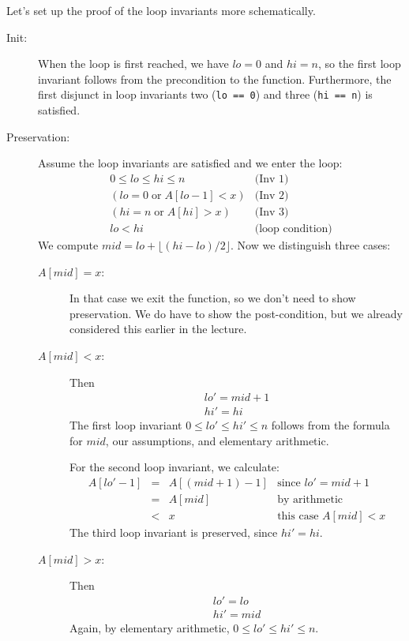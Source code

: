 \clearpage
Let's set up the proof of the loop invariants more schematically.
\begin{description}
\item[Init: ]%
  When the loop is first reached, we have $\mathit{lo} = 0$ and $\mathit{hi} =
  n$, so the first loop invariant follows from the precondition to the
  function.  Furthermore, the first disjunct in loop invariants two
  (\lstinline'lo == 0') and three (\lstinline'hi == n') is satisfied.
\item[Preservation: ]%
  Assume the loop invariants are satisfied and we enter the loop:
  $$
  \begin{array}{ll}
     0 \leq \mathit{lo} \leq \mathit{hi} \leq n           & \text{(Inv 1)}
  \\ (\mathit{lo} = 0\; \text{or}\; A[\mathit{lo}-1] < x) & \text{(Inv 2)}
  \\ (\mathit{hi} = n\; \text{or}\; A[\mathit{hi}] > x)   & \text{(Inv 3)}
  \\ \mathit{lo} < \mathit{hi}                            & \text{(loop condition)}
  \end{array}
  $$
  We compute $\mathit{mid} = \mathit{lo} + \lfloor (\mathit{hi}-\mathit{lo})/2
  \rfloor$.  Now we distinguish three cases:
  \begin{description}
  \item[{$A[\mathit{mid}] = x$}: ]%
    In that case we exit the function, so we don't need to show preservation.
    We do have to show the post-condition, but we already considered this
    earlier in the lecture.
  \item[{$A[\mathit{mid}] < x$}: ]%
    Then
    $$
    \begin{array}{l}
       \mathit{lo}' = \mathit{mid}+1
    \\ \mathit{hi}' = \mathit{hi}
    \end{array}
    $$
    The first loop invariant $0 \leq \mathit{lo}' \leq \mathit{hi}' \leq n$
    follows from the formula for $\mathit{mid}$, our assumptions, and
    elementary arithmetic.

    For the second loop invariant, we calculate:
    $$
    \begin{array}{lcll}
       A[\mathit{lo}'-1] &=& A[(\mathit{mid}+1)-1]
     & \text{since } \mathit{lo}' = \mathit{mid}+1
    \\                   &=& A[\mathit{mid}]
     & \text{by arithmetic}
    \\                   &<& x
     & \text{this case } A[\mathit{mid}] < x
    \end{array}
    $$
    The third loop invariant is preserved, since $\mathit{hi}' =
    \mathit{hi}$.
  \item[{$A[\mathit{mid}] > x$}: ]%
    Then
    $$
    \begin{array}{l}
       \mathit{lo}' = \mathit{lo}
    \\ \mathit{hi}' = \mathit{mid}
    \end{array}
    $$
    Again, by elementary arithmetic, $0 \leq \mathit{lo}' \leq \mathit{hi}' \leq n$.


\end{description}
\end{description}
